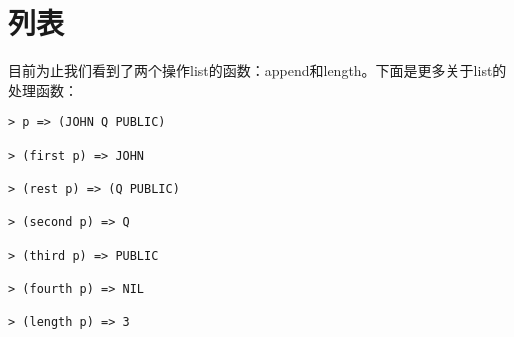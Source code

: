 \section{列表}
目前为止我们看到了两个操作list的函数：append和length。下面是更多关于list的处理函数：
\begin{lstlisting}[frame=shadowbox]
> p => (JOHN Q PUBLIC)

> (first p) => JOHN

> (rest p) => (Q PUBLIC)

> (second p) => Q

> (third p) => PUBLIC

> (fourth p) => NIL

> (length p) => 3
\end{lstlisting}

